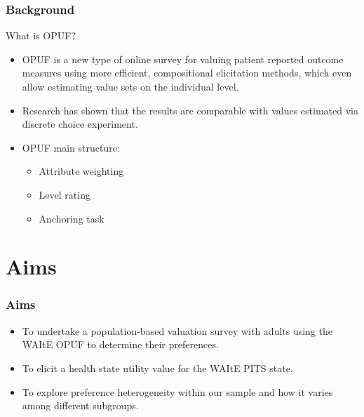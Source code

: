 \documentclass[t,compress,9pt,aspectratio=169]{beamer}
\begin{document}
\begin{frame}[fragile]
\frametitle{Background}
\begin{block}{What is OPUF?}
    \begin{itemize}
      \item OPUF is a new type of online survey for valuing patient reported outcome measures using more efficient, compositional elicitation methods, which even allow estimating value sets on the individual level. %
      \item Research has shown that the results are comparable with values estimated via discrete choice experiment.
      \item OPUF main structure:
      \begin{itemize}
          \item Attribute weighting
          \item Level rating
          \item Anchoring task
      \end{itemize}
    \end{itemize}
\end{block}
\end{frame}





\section{Aims}
\begin{frame}[fragile]
\frametitle{Aims}
\begin{itemize}
  \item To undertake a population-based valuation survey with adults using the WAItE OPUF to determine their preferences.
  \item To elicit a health state utility value for the WAItE PITS state.
  \item To explore preference heterogeneity within our sample and how it varies among different subgroups.
\end{itemize}
\end{frame}
\end{document}
